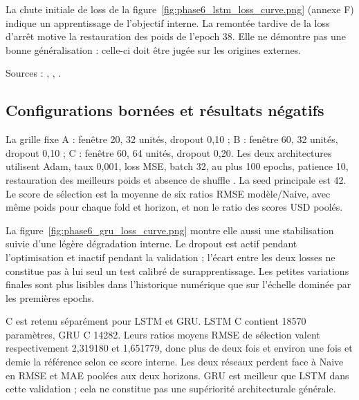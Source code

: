 La chute initiale de loss de la figure~\ref{fig:phase6_lstm_loss_curve.png} (annexe F) indique un apprentissage de l’objectif interne. La remontée tardive de la loss d’arrêt motive la restauration des poids de l’epoch 38. Elle ne démontre pas une bonne généralisation : celle-ci doit être jugée sur les origines externes.



Sources : , , .





\subsection{Configurations bornées et résultats négatifs}



La grille fixe A : fenêtre 20, 32 unités, dropout 0,10 ; B : fenêtre 60, 32 unités, dropout 0,10 ; C : fenêtre 60, 64 unités, dropout 0,20. Les deux architectures utilisent Adam, taux 0,001, loss MSE, batch 32, au plus 100 epochs, patience 10, restauration des meilleurs poids et absence de shuffle \cite{R13}. La seed principale est 42. Le score de sélection est la moyenne de six ratios RMSE modèle/Naive, avec même poids pour chaque fold et horizon, et non le ratio des scores USD poolés.







La figure~\ref{fig:phase6_gru_loss_curve.png} montre elle aussi une stabilisation suivie d’une légère dégradation interne. Le dropout est actif pendant l’optimisation et inactif pendant la validation ; l’écart entre les deux losses ne constitue pas à lui seul un test calibré de surapprentissage. Les petites variations finales sont plus lisibles dans l’historique numérique que sur l’échelle dominée par les premières epochs.



C est retenu séparément pour LSTM et GRU. LSTM C contient 18570 paramètres, GRU C 14282. Leurs ratios moyens RMSE de sélection valent respectivement 2,319180 et 1,651779, donc plus de deux fois et environ une fois et demie la référence selon ce score interne. Les deux réseaux perdent face à Naive en RMSE et MAE poolées aux deux horizons. GRU est meilleur que LSTM dans cette validation ; cela ne constitue pas une supériorité architecturale générale.

